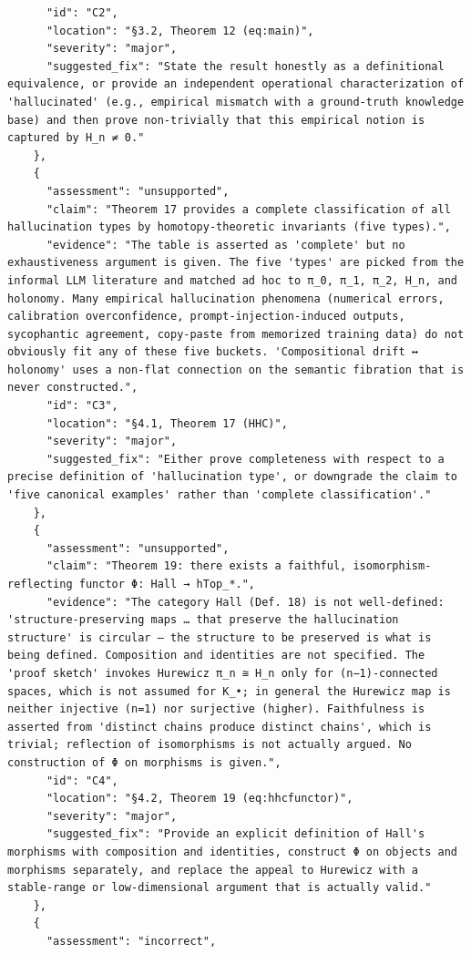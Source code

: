 \documentclass[11pt]{article}
\begin{document}
\begin{verbatim}
      "id": "C2",
      "location": "§3.2, Theorem 12 (eq:main)",
      "severity": "major",
      "suggested_fix": "State the result honestly as a definitional equivalence, or provide an independent operational characterization of 'hallucinated' (e.g., empirical mismatch with a ground-truth knowledge base) and then prove non-trivially that this empirical notion is captured by H_n ≠ 0."
    },
    {
      "assessment": "unsupported",
      "claim": "Theorem 17 provides a complete classification of all hallucination types by homotopy-theoretic invariants (five types).",
      "evidence": "The table is asserted as 'complete' but no exhaustiveness argument is given. The five 'types' are picked from the informal LLM literature and matched ad hoc to π_0, π_1, π_2, H_n, and holonomy. Many empirical hallucination phenomena (numerical errors, calibration overconfidence, prompt-injection-induced outputs, sycophantic agreement, copy-paste from memorized training data) do not obviously fit any of these five buckets. 'Compositional drift ↔ holonomy' uses a non-flat connection on the semantic fibration that is never constructed.",
      "id": "C3",
      "location": "§4.1, Theorem 17 (HHC)",
      "severity": "major",
      "suggested_fix": "Either prove completeness with respect to a precise definition of 'hallucination type', or downgrade the claim to 'five canonical examples' rather than 'complete classification'."
    },
    {
      "assessment": "unsupported",
      "claim": "Theorem 19: there exists a faithful, isomorphism-reflecting functor Φ: Hall → hTop_*.",
      "evidence": "The category Hall (Def. 18) is not well-defined: 'structure-preserving maps … that preserve the hallucination structure' is circular — the structure to be preserved is what is being defined. Composition and identities are not specified. The 'proof sketch' invokes Hurewicz π_n ≅ H_n only for (n−1)-connected spaces, which is not assumed for K_•; in general the Hurewicz map is neither injective (n=1) nor surjective (higher). Faithfulness is asserted from 'distinct chains produce distinct chains', which is trivial; reflection of isomorphisms is not actually argued. No construction of Φ on morphisms is given.",
      "id": "C4",
      "location": "§4.2, Theorem 19 (eq:hhcfunctor)",
      "severity": "major",
      "suggested_fix": "Provide an explicit definition of Hall's morphisms with composition and identities, construct Φ on objects and morphisms separately, and replace the appeal to Hurewicz with a stable-range or low-dimensional argument that is actually valid."
    },
    {
      "assessment": "incorrect",

\end{verbatim}
\end{document}
